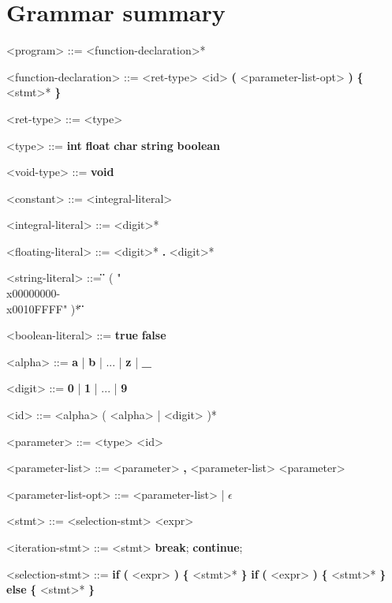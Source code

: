\documentclass{article}
\begin{document}
	\section{Grammar summary}
		\itshape
		\setlength{\grammarindent}{12em}

		\begin{grammar}
			<program> ::= <function-declaration>*
			
			<function-declaration> ::= <ret-type> <id> \textbf{(} <parameter-list-opt> \textbf{)} \textbf{\{} <stmt>* \textbf{\}}

			<ret-type> ::= <type>
			\alt <void-type>
			
			<type> ::= \textbf{int}
			\alt \textbf{float}
			\alt \textbf{char}
			\alt \textbf{string}
			\alt \textbf{boolean}
			
			<void-type> ::= \textbf{void}
						
			<constant> ::= <integral-literal>
			\alt <floating-literal>
			\alt <string-literal>
			\alt <boolean-literal>
			
			<integral-literal> ::= <digit>*
			
			<floating-literal> ::= <digit>* \textbf{.} <digit>*
			
			<string-literal> ::= \textbf{\"} ( "\\x00000000-\\x0010FFFF" )*  \textbf{\"}
			
			<boolean-literal> ::= \textbf{true}
			\alt \textbf{false}
			
			<alpha> ::= \textbf{a} | \textbf{b} | ... | \textbf{z} | \textbf{_}

			<digit> ::= \textbf{0} | \textbf{1} | ... | \textbf{9}

	
			<id> ::= <alpha> ( <alpha> | <digit> )*
			
			<parameter> ::= <type> <id>
			
			<parameter-list> ::= <parameter> \textbf{,} <parameter-list>
			\alt <parameter>
			
			<parameter-list-opt> ::= <parameter-list> | $\epsilon$
			
			<stmt> ::= <selection-stmt>
			\alt <iteration-stmt>
			\alt <jump-stmt>
			\alt <expr>
			
			<iteration-stmt> ::= <stmt>
			\alt \textbf{break};
			\alt \textbf{continue};
			
			<selection-stmt> ::= \textbf{if} \textbf{(} <expr> \textbf{)} \textbf{\{} <stmt>* \textbf{\}}
			\alt \textbf{if} \textbf{(} <expr> \textbf{)} \textbf{\{} <stmt>* \textbf{\}} \textbf{else} \textbf{\{} <stmt>* \textbf{\}}
			

\end{grammar}
\end{document}
